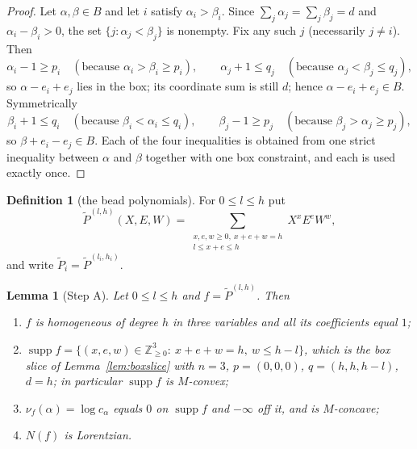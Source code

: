 \documentclass[11pt]{article}
\theoremstyle{plain}
\newtheorem{lemma}[theorem]{Lemma}
\theoremstyle{definition}
\newtheorem{definition}[theorem]{Definition}
\DeclareMathOperator{\supp}{supp}
\newcommand{\Z}{\mathbb{Z}}
\newcommand{\Pt}{\widetilde P}
\begin{document}
\begin{proof}
Let $\alpha,\beta\in B$ and let $i$ satisfy $\alpha_i>\beta_i$. Since
$\sum_j\alpha_j=\sum_j\beta_j=d$ and $\alpha_i-\beta_i>0$, the set
$\{j:\alpha_j<\beta_j\}$ is nonempty. Fix any such $j$ (necessarily $j\ne i$). Then
\[
  \alpha_i-1\ge p_i\quad(\text{because }\alpha_i>\beta_i\ge p_i),\qquad
  \alpha_j+1\le q_j\quad(\text{because }\alpha_j<\beta_j\le q_j),
\]
so $\alpha-e_i+e_j$ lies in the box; its coordinate sum is still $d$; hence
$\alpha-e_i+e_j\in B$. Symmetrically
\[
  \beta_i+1\le q_i\quad(\text{because }\beta_i<\alpha_i\le q_i),\qquad
  \beta_j-1\ge p_j\quad(\text{because }\beta_j>\alpha_j\ge p_j),
\]
so $\beta+e_i-e_j\in B$. Each of the four inequalities is obtained from one strict
inequality between $\alpha$ and $\beta$ together with one box constraint, and each is used
exactly once.
\end{proof}

\begin{definition}[the bead polynomials]
For $0\le l\le h$ put
\[
  \Pt^{(l,h)}(X,E,W)=\sum_{\substack{x,e,w\ge0,\ x+e+w=h\\ l\le x+e\le h}}X^xE^eW^w,
\]
and write $\Pt_i=\Pt^{(l_i,h_i)}$.
\end{definition}

\begin{lemma}[Step A]\label{lem:stepA}
Let $0\le l\le h$ and $f=\Pt^{(l,h)}$. Then
\begin{enumerate}
\item[(a)] $f$ is homogeneous of degree $h$ in three variables and all its coefficients
equal $1$;
\item[(b)] $\supp f=\{(x,e,w)\in\Z_{\ge0}^3:\ x+e+w=h,\ w\le h-l\}$, which is the box slice
of Lemma~\ref{lem:boxslice} with $n=3$, $p=(0,0,0)$, $q=(h,h,h-l)$, $d=h$; in particular
$\supp f$ is $M$-convex;
\item[(c)] $\nu_f(\alpha)=\log c_\alpha$ equals $0$ on $\supp f$ and $-\infty$ off it, and
is $M$-concave;
\item[(d)] $N(f)$ is Lorentzian.
\end{enumerate}
\end{lemma}
\end{document}
